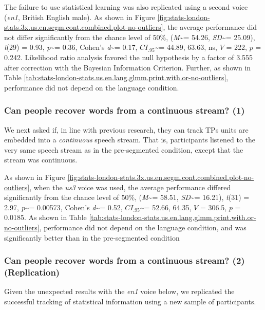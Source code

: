 \documentclass[
]{article}
\newcommand{\T}{{\em t\/}}
\newcommand{\p}{{\em p\/}}
\newcommand{\M}{{\em M\/}}
\newcommand{\SD}{{\em SD\/}}
\newcommand{\D}{Cohen's {\em d\/}}
\newcommand{\CI}{$CI_{.95}$}
\begin{document}
The failure to use statistical learning was also replicated using a
second voice (\emph{en1}, British English male). As shown in Figure
\ref{fig:stats-london-stats.3x.us.en.segm.cont.combined.plot-no-outliers},
the average performance did not differ significantly from the chance
level of 50\%, (\M\textasciitilde= 54.26, \SD\textasciitilde= 25.09),
\T(29) = 0.93, \p\textasciitilde= 0.36, \D\textasciitilde= 0.17,
\CI\textasciitilde= 44.89, 63.63, ns, \(V\) = 222, \(p\) = 0.242.
Likelihood ratio analysis favored the null hypothesis by a factor of
3.555 after correction with the Bayesian Information Criterion. Further,
as shown in Table
\ref{tab:stats-london-stats.us.en.lang.glmm.print.with.or-no-outliers},
performance did not depend on the language condition.

\subsubsection{Can people recover words from a continuous stream?
(1)}\label{can-people-recover-words-from-a-continuous-stream-1-1}

We next asked if, in line with previous research, they can track TPs
units are embedded into a \emph{continuous} speech stream. That is,
participants listened to the very same speech stream as in the
pre-segmented condition, except that the stream was continuous.

As shown in Figure
\ref{fig:stats-london-stats.3x.us.en.segm.cont.combined.plot-no-outliers},
when the \emph{us3} voice was used, the average performance differed
significantly from the chance level of 50\%, (\M\textasciitilde= 58.51,
\SD\textasciitilde= 16.21), \T(31) = 2.97, \p\textasciitilde= 0.00573,
\D\textasciitilde= 0.52, \CI\textasciitilde= 52.66, 64.35, \(V\) =
306.5, \(p\) = 0.0185. As shown in Table
\ref{tab:stats-london-stats.us.en.lang.glmm.print.with.or-no-outliers},
performance did not depend on the language condition, and was
significantly better than in the pre-segmented condition

\subsubsection{Can people recover words from a continuous stream? (2)
(Replication)}\label{can-people-recover-words-from-a-continuous-stream-2-replication-1}

Given the unexpected results with the \emph{en1} voice below, we
replicated the successful tracking of statistical information using a
new sample of participants.
\end{document}
